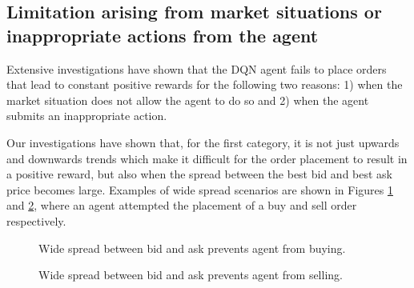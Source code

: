 \subsection{Limitation arising from market situations or inappropriate actions from the agent}
Extensive investigations have shown that the DQN agent fails to place orders that lead to constant positive rewards for the following two reasons: 1) when the market situation does not allow the agent to do so and 2) when the agent submits an inappropriate action.

Our investigations have shown that, for the first category, it is not just upwards and downwards trends which make it difficult for the order placement to result in a positive reward, but also when the spread between the best bid and best ask price becomes large.
Examples of wide spread scenarios are shown in Figures \ref{fig:analysis-limit-wide-spread-buy} and \ref{fig:analysis-limit-wide-spread-sell}, where an agent attempted the placement of a buy and sell order respectively.
\begin{figure}[H]
    \centering
    \caption{Wide spread between bid and ask prevents agent from buying.}
    \label{fig:analysis-limit-wide-spread-buy}
\end{figure}
\begin{figure}[H]
    \centering
    \caption{Wide spread between bid and ask prevents agent from selling.}
    \label{fig:analysis-limit-wide-spread-sell}
\end{figure}
